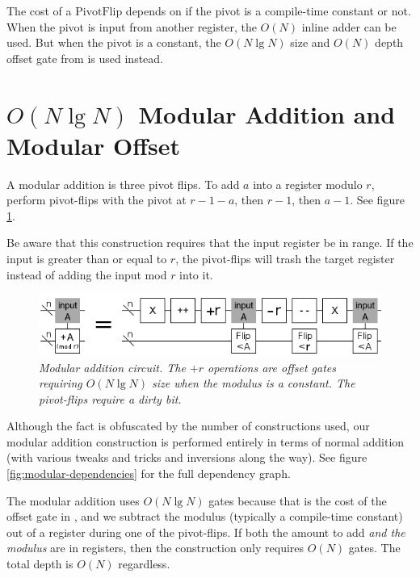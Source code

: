 \documentclass[twocolumn]{article}
\begin{document}
The cost of a $\text{PivotFlip}$ depends on if the pivot is a compile-time constant or not.
When the pivot is input from another register, the $O(N)$ inline adder can be used.
But when the pivot is a constant, the $O(N \lg N)$ size and $O(N)$ depth offset gate from \cite{haner2016} is used instead.

\section{$O(N \lg N)$ Modular Addition and Modular Offset} \label{sec:last-circuit}

A modular addition is three pivot flips.
To add $a$ into a register modulo $r$, perform pivot-flips with the pivot at $r-1-a$, then $r-1$, then $a-1$.
See figure \ref{fig:modular-add}.

Be aware that this construction requires that the input register be in range.
If the input is greater than or equal to $r$, the pivot-flips will trash the target register instead of adding the input mod $r$ into it.

\begin{figure}
  \centering
  \includegraphics[totalheight=1.4cm]{modular-addition.png}
  \caption{\em Modular addition circuit.
  The $+r$ operations are offset gates requiring $O(N \lg N)$ size when the modulus is a constant.
  The pivot-flips require a dirty bit.}
  \label{fig:modular-add}
\end{figure}

Although the fact is obfuscated by the number of constructions used, our modular addition construction is performed entirely in terms of normal addition (with various tweaks and tricks and inversions along the way).
See figure \ref{fig:modular-dependencies} for the full dependency graph.

The modular addition uses $O(N \lg N)$ gates because that is the cost of the offset gate in \cite{haner2016}, and we subtract the modulus (typically a compile-time constant) out of a register during one of the pivot-flips.
If both the amount to add {\em and the modulus} are in registers, then the construction only requires $O(N)$ gates.
The total depth is $O(N)$ regardless.
\end{document}
